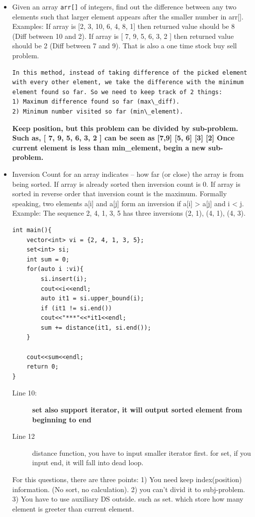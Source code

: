 \documentclass[a4paper,11pt,twoside]{book}
\begin{document}
\begin{itemize}
	\item Given an array \texttt{arr[]} of integers, find out the difference between any two elements such that larger element appears after the smaller number in arr[]. Examples: If array is [2, 3, 10, 6, 4, 8, 1] then returned value should be 8 (Diff between 10 and 2). If array is [ 7, 9, 5, 6, 3, 2 ] then returned value should be 2 (Diff between 7 and 9). That is also a one time stock buy sell problem.
\begin{lstlisting}[breaklines]
In this method, instead of taking difference of the picked element with every other element, we take the difference with the minimum element found so far. So we need to keep track of 2 things:
1) Maximum difference found so far (max\_diff).
2) Minimum number visited so far (min\_element).
\end{lstlisting}
\textbf{Keep position, but this problem can be divided by sub-problem. Such as, [ 7, 9, 5, 6, 3, 2 ] can be seen as [7,9] [5, 6] [3] [2]  Once current element is less than min\_element, begin a new sub-problem.}


	\item Inversion Count for an array indicates -- how far (or close) the array is from being sorted. If array is already sorted then inversion count is 0. If array is sorted in reverse order that inversion count is the maximum. Formally speaking, two elements a[i] and a[j] form an inversion if a[i] > a[j] and i < j. Example: The sequence 2, 4, 1, 3, 5 has three inversions (2, 1), (4, 1), (4, 3).

\begin{lstlisting}[breaklines]
int main(){
	vector<int> vi = {2, 4, 1, 3, 5};
	set<int> si;
	int sum = 0;
	for(auto i :vi){
		si.insert(i);
		cout<<i<<endl;
		auto it1 = si.upper_bound(i);
		if (it1 != si.end())
		cout<<"***"<<*it1<<endl;
		sum += distance(it1, si.end());
	}
	
	cout<<sum<<endl;
	return 0;
}
\end{lstlisting}
\begin{description}
	\item[Line 10:] \textbf{set also support iterator, it will output sorted element from beginning to end }
	\item[Line 12] distance function, you have to input smaller iterator first. for set, if you input end, it will fall into dead loop.
\end{description}

For this questions, there are three points: 1) You need keep index(position) information. (No sort, no calculation).  2) you can't divid it to subj-problem. 3) You have to use auxiliary DS outside. such as set. which store how many element is greeter than current element.  



\end{itemize}
\end{document}
